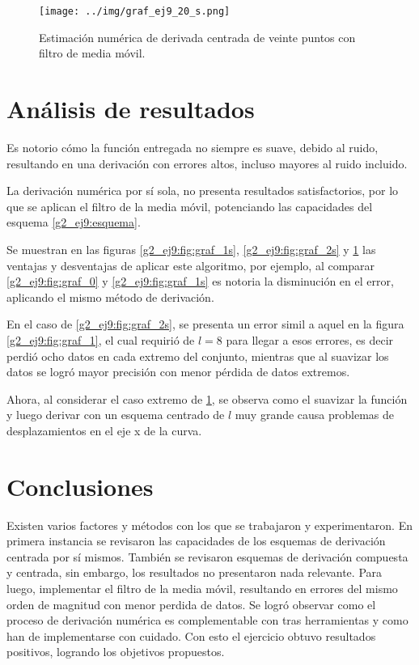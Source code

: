 \documentclass[../portafolio.tex]{subfiles}
\begin{document}
\begin{figure}
\centering
\texttt{[image: ../img/graf\_ej9\_20\_s.png]}
\caption{Estimación numérica de derivada centrada de veinte puntos con filtro de media móvil.} \label{g2_ej9:fig:graf_20s}
\end{figure}

\section{Análisis de resultados}
Es notorio cómo la función entregada no siempre es suave, debido al ruido, resultando en una derivación con errores altos, incluso mayores al ruido incluido.

La derivación numérica por sí sola, no presenta resultados satisfactorios, por lo que se aplican el filtro de la media móvil, potenciando las capacidades del esquema \eqref{g2_ej9:esquema}.

Se muestran en las figuras \ref{g2_ej9:fig:graf_1s}, \ref{g2_ej9:fig:graf_2s} y \ref{g2_ej9:fig:graf_20s} las ventajas y desventajas de aplicar este algoritmo, por ejemplo, al comparar \ref{g2_ej9:fig:graf_0} y \ref{g2_ej9:fig:graf_1s} es notoria la disminución en el error, aplicando el mismo método de derivación. 

En el caso de \ref{g2_ej9:fig:graf_2s}, se presenta un error simil a aquel en la figura \ref{g2_ej9:fig:graf_1}, el cual requirió de $l=8$ para llegar a esos errores, es decir perdió ocho datos en cada extremo del conjunto, mientras que al suavizar los datos se logró mayor precisión con menor pérdida de datos extremos.

Ahora, al considerar el caso extremo de \ref{g2_ej9:fig:graf_20s}, se observa como el suavizar la función y luego derivar con un esquema centrado de $l$ muy grande causa problemas de desplazamientos en el eje x de la curva.

\section*{Conclusiones}
Existen varios factores y métodos con los que se trabajaron y experimentaron. En primera instancia se revisaron las capacidades de los esquemas de derivación centrada por sí mismos. También se revisaron esquemas de derivación compuesta y centrada, sin embargo, los resultados no presentaron nada relevante. Para luego, implementar el filtro de la media móvil, resultando en errores del mismo orden de magnitud con menor perdida de datos. Se logró observar como el proceso de derivación numérica es complementable con tras herramientas y como han de implementarse con cuidado. Con esto el ejercicio obtuvo resultados positivos, logrando los objetivos propuestos.
\end{document}
